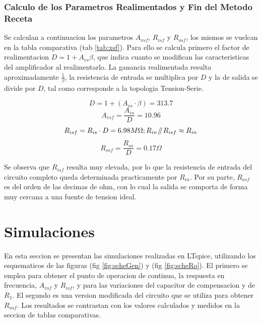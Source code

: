 \documentclass[11pt,a4paper]{article}
\newcommand{\parallelsum}{\mathbin{\!/\mkern-5mu/\!}}
\begin{document}
\subsubsection{Calculo de los Parametros Realimentados y Fin del Metodo Receta}\label{sec:CalcXvsf}

Se calculan a continuacion los parametros \(A_{vsf}\), \(R_{isf}\) y \(R_{osf}\), los mismos se vuelcan en la tabla comparativa (tab \ref{tab:xsf}). Para ello se calcula primero el factor de realimentacion \(D = 1 + A_{vs} \beta\), que indica cuanto se modifican las caracteristicas del amplificador al realimentarlo. La ganancia realimentada resulta aproximadamente \(\frac{1}{\beta}\), la resistencia de entrada se multiplica por \(D\) y la de salida se divide por \(D\), tal como corresponde a la topologia Tension-Serie.

\begin{equation}
D = 1 + (A_{vs} \cdot \beta) = 313.7
\end{equation}
\begin{equation}
A_{vsf} = \frac{A_{vs}}{D} = 10.96
\end{equation}
\begin{equation}
R_{isf} = R_{is} \cdot D = 6.98M\Omega; R_{in} \parallelsum R_{isf} \approx R_{in} 
\end{equation}
\begin{equation}
R_{osf} = \frac{R_{os}}{D} = 0.17\Omega
\end{equation}

Se observa que \(R_{isf}\) resulta muy elevada, por lo que la resistencia de entrada del circuito completo queda determinada practicamente por \(R_{in}\). Por su parte, \(R_{osf}\) es del orden de las decimas de ohm, con lo cual la salida se comporta de forma muy cercana a una fuente de tension ideal.

\newpage

\newpage
\section{Simulaciones}

En esta seccion se presentan las simulaciones realizadas en LTspice, utilizando los esquematicos de las figuras (fig \ref{fig:scheGen}) y (fig \ref{fig:scheRo}). El primero se emplea para obtener el punto de operacion de continua, la respuesta en frecuencia, \(A_{vsf}\) y \(R_{isf}\), y para las variaciones del capacitor de compensacion y de \(R_1\). El segundo es una version modificada del circuito que se utiliza para obtener \(R_{osf}\). Los resultados se contrastan con los valores calculados y medidos en la seccion de tablas comparativas.
\end{document}
